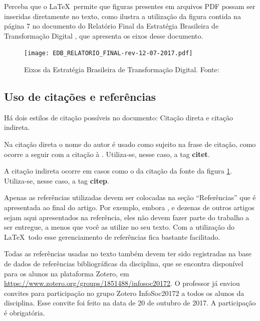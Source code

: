 \documentclass[12pt]{article}
\begin{document}
	Perceba que o \LaTeX\ permite que figuras presentes em arquivos PDF possam ser inseridas diretamente no texto, como ilustra a utilização da figura contida na página 7 no documento do Relatório Final da Estratégia Brasileira de Transformação Digital \citep{gt_interministerial_port._n_842/2017_estrategia_2017}, que apresenta os eixos desse documento.

	\begin{figure}[ht]
		\centering
		\texttt{[image: EDB\_RELATORIO\_FINAL-rev-12-07-2017.pdf]}
		\caption{Eixos da Estratégia Brasileira de Transformação Digital.\label{EBTD} Fonte: \citep[p. 7]{gt_interministerial_port._n_842/2017_estrategia_2017}}
	\end{figure}

	\subsection{Uso de citações e referências}

	Há dois estilos de citação possíveis no documento: Citação direta e citação indireta.

	Na citação direta o nome do autor é usado como sujeito na frase de citação, como ocorre a seguir com a citação à \citet{gt_interministerial_port._n_842/2017_estrategia_2017}. Utiliza-se, nesse caso, a tag \textbf{citet}.

	A citação indireta ocorre em casos como o da citação da fonte da figura \ref{EBTD}. Utiliza-se, nesse caso, a tag \textbf{citep}.

	Apenas as referências utilizadas devem ser colocadas na seção ``Referências'' que é apresentada ao final do artigo.
	Por exemplo, embora \cite{adams_view_2016}, \cite{al-garadi_cybercrime_2016} e dezenas de outros artigos sejam aqui apresentados na referência,
	eles não devem fazer parte do trabalho a ser entregue, a menos que você as utilize no seu texto.
	Com a utilização do \LaTeX\ todo esse gerenciamento de referências fica bastante facilitado.

	Todas as referências usadas no texto também devem ter sido registradas na base de dados de referências bibliográficas da disciplina, que se encontra disponível para os alunos na plataforma Zotero, em \href{https://www.zotero.org/groups/1851488/infosoc20172}{https://www.zotero.org/groups/1851488/infosoc20172}. O professor já enviou convites para participação no grupo Zotero InfoSoc20172 a todos os alunos da disciplina. Esse convite foi feito na data de 20 de outubro de 2017. A participação é obrigatória.
\end{document}

